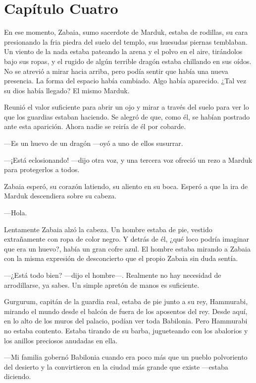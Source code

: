 \chapter*{Capítulo Cuatro}

En ese momento, Zabaia, sumo sacerdote de Marduk, estaba de rodillas, su
cara presionando la fria piedra del suelo del templo, sus huesudas
piernas temblaban. Un viento de la nada estaba pateando la arena y el
polvo en el aire, tirándolos bajo sus ropas, y el rugido de algún
terrible dragón estaba chillando en sus oídos. No se atrevió a mirar
hacia arriba, pero podía sentir que había una nueva presencia. La forma
del espacio había cambiado. Algo había aparecido. ¿Tal vez su dios había
llegado? El mismo Marduk.

Reunió el valor suficiente para abrir un ojo y mirar a través del suelo
para ver lo que los guardias estaban haciendo. Se alegró de que, como
él, se habían postrado ante esta aparición. Ahora nadie se reiría de él
por cobarde.

---Es un huevo de un dragón ---oyó a uno de ellos susurrar.

---¡Está eclosionando! ---dijo otra voz, y una tercera voz ofreció un
rezo a Marduk para protegerlos a todos.

Zabaia esperó, su corazón latiendo, su aliento en su boca. Esperó a que
la ira de Marduk descendiera sobre su cabeza.

---Hola.

Lentamente Zabaia alzó la cabeza. Un hombre estaba de pie, vestido
extrañamente con ropa de color negro. Y detrás de él, ¿qué loco podría
imaginar que era un huevo?, había un gran cofre azul. El hombre estaba
mirando a Zabaia con la misma expresión de desconcierto que el propio
Zabaia sin duda sentía.

---¿Está todo bien? ---dijo el hombre---. Realmente no hay necesidad de
arrodillarse, ya sabes. Un simple apretón de manos es suficiente.

Gurgurum, capitán de la guardia real, estaba de pie junto a su rey,
Hammurabi, mirando el mundo desde el balcón de fuera de los aposentos
del rey. Desde aquí, en lo alto de los muros del palacio, podían ver
toda Babilonia. Pero Hammurabi no estaba contento. Estaba tirando de su
barba, jugueteando con los abalorios y los anillos preciosos anudadas en
ella.

---Mi familia gobernó Babilonia cuando era poco más que un pueblo
polvoriento del desierto y la convirtieron en la ciudad más grande que
existe ---estaba diciendo.

